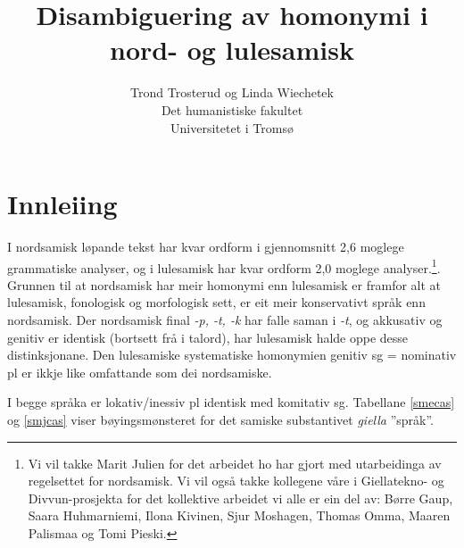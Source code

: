 \documentclass[a4paper,nynorsk]{article}
\begin{document}
\title{Disambiguering av homonymi i nord- og lulesamisk}

\author{Trond Trosterud og Linda Wiechetek\\
Det humanistiske fakultet\\
Universitetet i Tromsø}

\maketitle

\tableofcontents %



% 

\section{Innleiing} 


I nordsamisk løpande tekst har kvar ordform i gjennomsnitt 2,6 moglege grammatiske analyser, og i lulesamisk har kvar ordform 2,0 moglege analyser.\footnote{Vi vil takke Marit Julien for det arbeidet ho har gjort med utarbeidinga av regelsettet for nordsamisk. Vi vil også takke kollegene våre i Giellatekno- og Divvun-prosjekta for det kollektive arbeidet vi alle er ein del av: Børre Gaup, Saara Huhmarniemi, Ilona Kivinen, Sjur Moshagen, Thomas Omma, Maaren Palismaa og Tomi Pieski.}. Grunnen til at nordsamisk har meir homonymi enn lulesamisk er framfor alt at lulesamisk, fonologisk og morfologisk sett, er eit meir konservativt språk enn nordsamisk. Der nordsamisk final \emph{-p, -t, -k} har falle saman i \emph{-t}, og akkusativ og genitiv er identisk (bortsett frå i talord), har lulesamisk halde oppe desse distinksjonane. Den lulesamiske systematiske homonymien genitiv sg = nominativ pl er ikkje like omfattande som dei nordsamiske. %

I begge språka er lokativ/inessiv pl identisk med komitativ sg. Tabellane \ref{smecas} og \ref{smjcas} viser bøyingsmønsteret for det samiske substantivet \emph{giella} ''språk''.%
\end{document}
